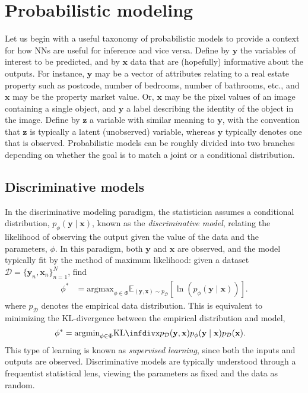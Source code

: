 \section{Probabilistic modeling}
Let us begin with a useful taxonomy of probabilistic models to provide a context for how NNs are useful for inference and vice versa. Define by $\mathbf{y}$ the variables of interest to be predicted, and by $\mathbf{x}$ data that are (hopefully) informative about the outputs. For instance, $\mathbf{y}$ may be a vector of attributes relating to a real estate property such as postcode, number of bedrooms, number of bathrooms, etc., and $\mathbf{x}$ may be the property market value. Or, $\mathbf{x}$ may be the pixel values of an image containing a single object, and $\mathbf{y}$ a label describing the identity of the object in the image. Define by $\mathbf{z}$ a variable with similar meaning to $\mathbf{y}$, with the convention that $\mathbf{z}$ is typically a latent (unobserved) variable, whereas $\mathbf{y}$ typically denotes one that is observed. Probabilistic models can be roughly divided into two branches depending on whether the goal is to match a joint or a conditional distribution.

\subsection{Discriminative models}
In the discriminative modeling paradigm, the statistician assumes a conditional distribution, $p_\phi(\mathbf{y}\mid\mathbf{x})$, known as the \emph{discriminative model}, relating the likelihood of observing the output given the value of the data and the parameters, $\phi$. In this paradigm, both $\mathbf{y}$ and $\mathbf{x}$ are observed, and the model typically fit by the method of maximum likelihood: given a dataset $\mathcal{D}=\{\mathbf{y}_n,\mathbf{x}_n\}_{n=1}^N$, find
\begin{align}\label{eq:max-likelihood}
	\phi^* &= \text{argmax}_{\phi\in\Phi}\mathbb{E}_{(\mathbf{y},\mathbf{x})\sim p_\mathcal{D}}\left[\ln\left(p_\phi\left(\mathbf{y}\mid\mathbf{x}\right)\right)\right].
\end{align}
where $p_\mathcal{D}$ denotes the empirical data distribution. This is equivalent to minimizing the KL-divergence between the empirical distribution and model,
\begin{align*}
	\phi^* &= \text{argmin}_{\phi\in\Phi}\infdiv{p_\mathcal{D}(\mathbf{y}, \mathbf{x})}{p_\phi(\mathbf{y}\mid\mathbf{x})p_\mathcal{D}(\mathbf{x})}.
\end{align*}
This type of learning is known as \emph{supervised learning}, since both the inputs and outputs are observed. Discriminative models are typically understood through a frequentist statistical lens, viewing the parameters as fixed and the data as random.

